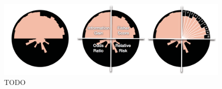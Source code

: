 \begin{figure}
\centering
\includegraphics[width=\linewidth]{figs/infuse/reading}
\caption{
TODO
}
\label{figs:infuse_reading}
\end{figure}